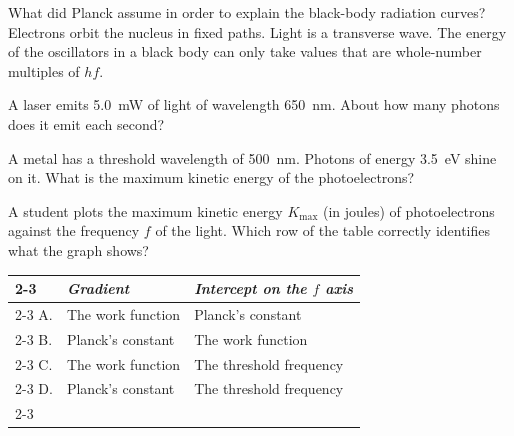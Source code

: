 \begin{quizq}{}
What did Planck assume in order to explain the black-body radiation curves?
  {Electrons orbit the nucleus in fixed paths.}
  {Light is a transverse wave.}
  {The energy of the oscillators in a black body can only take values that are whole-number multiples
   of $hf$.}
\end{quizq}

\begin{quizq}{}
A laser emits \qty{5.0}{mW} of light of wavelength \qty{650}{nm}. About how many photons does it emit
each second?
\end{quizq}

\begin{quizq}{}
A metal has a threshold wavelength of \qty{500}{nm}. Photons of energy \qty{3.5}{eV} shine on it. What is
the maximum kinetic energy of the photoelectrons?
\end{quizq}

\begin{quizq}{}
A student plots the maximum kinetic energy $K_\mathrm{max}$ (in joules) of photoelectrons against the
frequency $f$ of the light. Which row of the table correctly identifies what the graph shows?
\begin{center}
  \renewcommand\arraystretch{1.7}
  \begin{tabular}{@{}p{10mm}|>{\centering\arraybackslash}p{45mm}|>{\centering\arraybackslash}p{60mm}|}
    \cline{2-3}
    & \textit{Gradient} & \textit{Intercept on the $f$ axis}\\ \cline{2-3}
    A. & The work function & Planck's constant\\ \cline{2-3}
    B. & Planck's constant & The work function\\ \cline{2-3}
    C. & The work function & The threshold frequency\\ \cline{2-3}
    D. & Planck's constant & The threshold frequency\\ \cline{2-3}
  \end{tabular}
\end{center}
\end{quizq}
